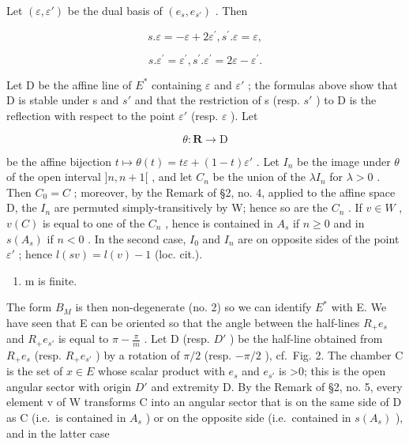 Let \((\varepsilon, \varepsilon')\) be the dual basis of \((e_s, e_{s'})\) . Then

\[
s. \varepsilon = - \varepsilon + 2 \varepsilon^ {\prime}, s ^ {\prime}. \varepsilon = \varepsilon ,
\]

\[
s. \varepsilon^ {\prime} = \varepsilon^ {\prime}, s ^ {\prime}. \varepsilon^ {\prime} = 2 \varepsilon - \varepsilon^ {\prime}.
\]

Let D be the affine line of \(E^{*}\) containing \(\varepsilon\) and \(\varepsilon'\) ; the formulas above show that D is stable under s and \(s'\) and that the restriction of s (resp. \(s'\) ) to D is the reflection with respect to the point \(\varepsilon'\) (resp. \(\varepsilon\) ). Let

\[
\theta : \mathbf {R} \to \mathrm{D}
\]

be the affine bijection \(t \mapsto \theta(t) = t\varepsilon + (1 - t)\varepsilon'\) . Let \(I_n\) be the image under \(\theta\) of the open interval \(]n, n + 1[\) , and let \(C_n\) be the union of the \(\lambda I_n\) for \(\lambda > 0\) . Then \(C_0 = C\) ; moreover, by the Remark of §2, no. 4, applied to the affine space D, the \(I_n\) are permuted simply-transitively by W; hence so are the \(C_n\) . If \(v \in W\) , \(v(C)\) is equal to one of the \(C_n\) , hence is contained in \(A_s\) if \(n \geqslant 0\) and in \(s(A_s)\) if \(n < 0\) . In the second case, \(I_0\) and \(I_n\) are on opposite sides of the point \(\varepsilon'\) ; hence \(l(sv) = l(v) - 1\) (loc. cit.).

\begin{enumerate}
\def\labelenumi{\alph{enumi})}
\setcounter{enumi}{1}
\tightlist
\item
  m is finite.
\end{enumerate}

The form \(B_{M}\) is then non-degenerate (no. 2) so we can identify \(E^{*}\) with E. We have seen that E can be oriented so that the angle between the half-lines \(R_{+}e_{s}\) and \(R_{+}e_{s'}\) is equal to \(\pi - \frac{\pi}{m}\) . Let D (resp. \(D'\) ) be the half-line obtained from \(R_{+}e_{s}\) (resp. \(R_{+}e_{s'}\) ) by a rotation of \(\pi/2\) (resp. \(-\pi/2\) ), cf.~Fig. 2. The chamber C is the set of \(x \in E\) whose scalar product with \(e_{s}\) and \(e_{s'}\) is \textgreater0; this is the open angular sector with origin \(D'\) and extremity D. By the Remark of §2, no. 5, every element v of W transforms C into an angular sector that is on the same side of D as C (i.e.~is contained in \(A_{s}\) ) or on the opposite side (i.e.~contained in \(s(A_{s})\) ), and in the latter case

